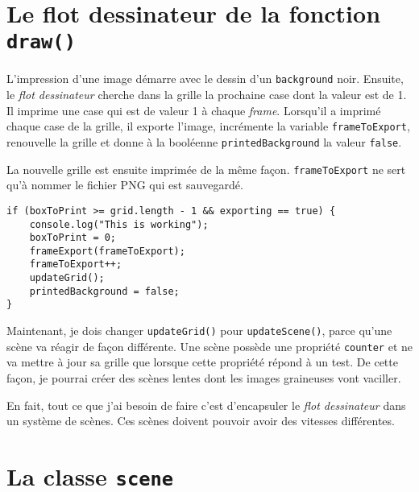 \newpage
\section{Le flot dessinateur de la fonction \lstinline|draw()|}
\noindent L'impression d'une image démarre avec le dessin d'un \lstinline|background| noir. Ensuite, le \textit{flot dessinateur} cherche dans la grille la prochaine case dont la valeur est de 1. Il imprime une case qui est de valeur 1 à chaque \textit{frame}. Lorsqu'il a imprimé chaque case de la grille, il exporte l'image, incrémente la variable \lstinline|frameToExport|, renouvelle la grille et donne à la booléenne \lstinline|printedBackground| la valeur \lstinline|false|.

La nouvelle grille est ensuite imprimée de la même façon. \lstinline|frameToExport| ne sert qu'à nommer le fichier PNG qui est sauvegardé.
\begin{lstlisting}
if (boxToPrint >= grid.length - 1 && exporting == true) {
    console.log("This is working");
    boxToPrint = 0;
    frameExport(frameToExport);
    frameToExport++;
    updateGrid();
    printedBackground = false;
}
\end{lstlisting}Maintenant, je dois changer \lstinline|updateGrid()| pour \lstinline|updateScene()|, parce qu'une scène va réagir de façon différente. Une scène possède une propriété \lstinline|counter| et ne va mettre à jour sa grille que lorsque cette propriété répond à un test. De cette façon, je pourrai créer des scènes lentes dont les images graineuses vont vaciller.

En fait, tout ce que j'ai besoin de faire c'est d'encapsuler le \textit{flot dessinateur} dans un système de scènes. Ces scènes doivent pouvoir avoir des vitesses différentes.

\newpage
\section{La classe \lstinline|scene|}
